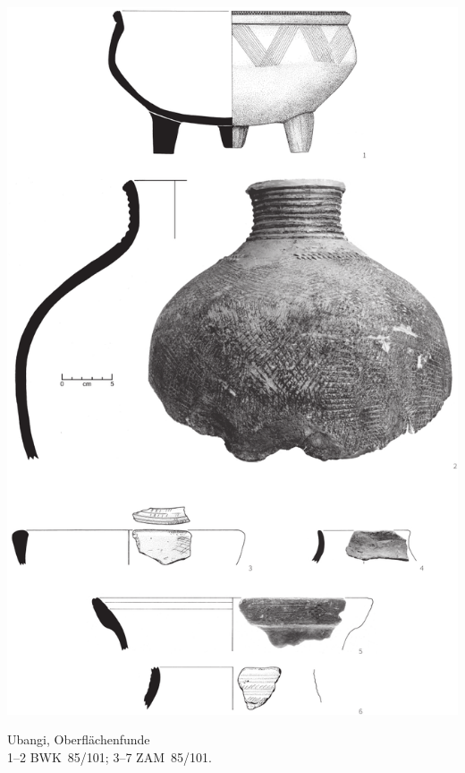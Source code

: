 \begin{pl}[H]
	\includegraphics{plt/Taf2.pdf}
	\vspace{.75em}\caption{\mbox{Ubangi}, Oberflächenfunde \\ 1--2 BWK~85/101; 3--7 ZAM~85/101.}
	\label{pl:2}
\end{pl}

